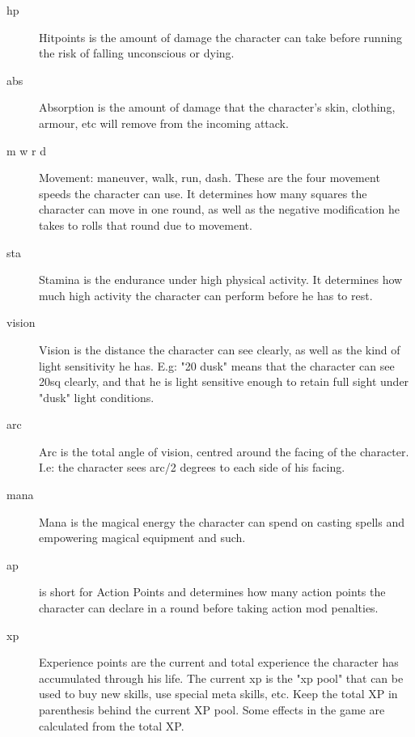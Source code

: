 \begin{description}

\item[hp] Hitpoints is the amount of damage the character can take before running the risk of falling unconscious or dying.

\item[abs] Absorption is the amount of damage that the character's skin, clothing, armour, etc will remove from the incoming attack.

\item[m w r d] Movement: maneuver, walk, run, dash. These are the four movement speeds the character can use. It determines how many squares the character can move in one round, as well as the negative modification he takes to rolls that round due to movement.

\item[sta] Stamina is the endurance under high physical activity. It determines how much high activity the character can perform before he has to rest.

\item[vision] Vision is the distance the character can see clearly, as well as the kind of light sensitivity he has. E.g: "20 dusk" means that the character can see 20sq clearly, and that he is light sensitive enough to retain full sight under "dusk" light conditions.

\item[arc] Arc is the total angle of vision, centred around the facing of the character. I.e: the character sees arc/2 degrees to each side of his facing.

\item[mana] Mana is the magical energy the character can spend on casting spells and empowering magical equipment and such.

\item[ap] is short for Action Points and determines how many action points the character can declare in a round before taking action mod penalties.

\item[xp] Experience points are the current and total experience the character has accumulated through his life. The current xp is the "xp pool" that can be used to buy new skills, use special meta skills, etc. Keep the total XP in parenthesis behind the current XP pool. Some effects in the game are calculated from the total XP.

\end{description}

